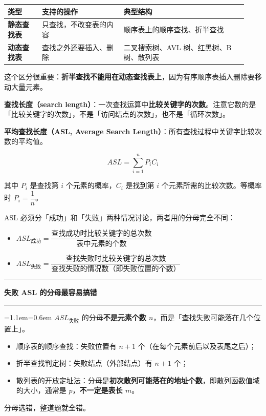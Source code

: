 \documentclass[11pt,openany,UTF8]{ctexbook}
\newcommand{\callouthead}[2]{%
  \par\addvspace{7pt}\noindent
  {\color{#1}\rule[-0.15em]{3pt}{1.05em}}\hspace{0.5em}%
  {\bfseries\color{#1}#2}\par\nobreak\vspace{-0.35em}%
  {\color{rulesep}\hrule height 0.4pt}\nobreak\vspace{0.45em}%
  \begingroup\small\setlength{\parindent}{0pt}%
  \leftskip=1.1em\rightskip=0.6em\noindent\ignorespaces}
\newcommand{\calloutend}{\par\endgroup\addvspace{7pt}}
\newenvironment{callwarn}[1]{\callouthead{warnbar}{#1}}{\calloutend}
\begin{document}
\begingroup\small\setlength{\tabcolsep}{4.0pt}
\begin{longtable}{@{}L{0.1393\linewidth}L{0.3134\linewidth}L{0.4759\linewidth}@{}}
\toprule
\textbf{类型} & \textbf{支持的操作} & \textbf{典型结构} \\
\midrule
\endhead
\textbf{静态查找表} & 只查找，不改变表的内容 & 顺序表上的顺序查找、折半查找 \\
\textbf{动态查找表} & 查找之外还要插入、删除 & 二叉搜索树、AVL 树、红黑树、B 树、散列表 \\
\bottomrule
\end{longtable}
\endgroup

这个区分很重要：\textbf{折半查找不能用在动态查找表上}，因为有序顺序表插入删除要移动大量元素。

\textbf{查找长度（search length）}：一次查找运算中\textbf{比较关键字的次数}。注意它数的是「比较关键字的次数」，不是「访问结点的次数」，也不是「循环次数」。

\textbf{平均查找长度（ASL, Average Search Length）}：所有查找过程中关键字比较次数的平均值。

\[ASL=\sum_{i=1}^{n}P_iC_i\]

其中 $P_i$ 是查找第 $i$ 个元素的概率，$C_i$ 是找到第 $i$ 个元素所需的比较次数。等概率时 $P_i=\dfrac{1}{n}$。

ASL 必须分「成功」和「失败」两种情况讨论，两者用的分母完全不同：

\begin{itemize}
\item $ASL_{成功}=\dfrac{\text{查找成功时比较关键字的总次数}}{\text{表中元素的个数}}$
\item $ASL_{失败}=\dfrac{\text{查找失败时比较关键字的总次数}}{\text{查找失败的情况数（即失败位置的个数）}}$
\end{itemize}
\begin{callwarn}{失败 ASL 的分母最容易搞错}
$ASL_{失败}$ 的分母\textbf{不是元素个数 $n$}，而是「查找失败可能落在几个位置上」。

\begin{itemize}
\item 顺序表的顺序查找：失败位置有 $n+1$ 个（在每个元素前后以及表尾之后）；
\item 折半查找判定树：失败结点（外部结点）有 $n+1$ 个；
\item 散列表的开放定址法：分母是\textbf{初次散列可能落在的地址个数}，即散列函数值域的大小，通常是 $p$，\textbf{不一定是表长 $m$}。
\end{itemize}
分母选错，整道题就全错。

\end{callwarn}
\end{document}
